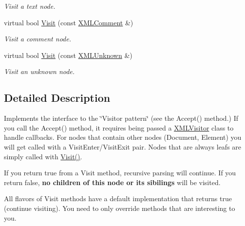 \begin{DoxyCompactItemize}
\begin{DoxyCompactList}\small\item\em Visit a text node. \end{DoxyCompactList}\item 
\mbox{\label{classtinyxml2_1_1XMLVisitor_acc8147fb5a85f6c65721654e427752d7}} 
virtual bool \hyperlink{classtinyxml2_1_1XMLVisitor_acc8147fb5a85f6c65721654e427752d7}{Visit} (const \hyperlink{classtinyxml2_1_1XMLComment}{X\+M\+L\+Comment} \&)
\begin{DoxyCompactList}\small\item\em Visit a comment node. \end{DoxyCompactList}\item 
\mbox{\label{classtinyxml2_1_1XMLVisitor_a14e4748387c34bf53d24e8119bb1f292}} 
virtual bool \hyperlink{classtinyxml2_1_1XMLVisitor_a14e4748387c34bf53d24e8119bb1f292}{Visit} (const \hyperlink{classtinyxml2_1_1XMLUnknown}{X\+M\+L\+Unknown} \&)
\begin{DoxyCompactList}\small\item\em Visit an unknown node. \end{DoxyCompactList}\end{DoxyCompactItemize}


\subsection{Detailed Description}
Implements the interface to the \char`\"{}\+Visitor pattern\char`\"{} (see the Accept() method.) If you call the Accept() method, it requires being passed a \hyperlink{classtinyxml2_1_1XMLVisitor}{X\+M\+L\+Visitor} class to handle callbacks. For nodes that contain other nodes (Document, Element) you will get called with a Visit\+Enter/\+Visit\+Exit pair. Nodes that are always leafs are simply called with \hyperlink{classtinyxml2_1_1XMLVisitor_adc75bd459fc7ba8223b50f0616767f9a}{Visit()}.

If you return \textquotesingle{}true\textquotesingle{} from a Visit method, recursive parsing will continue. If you return false, {\bfseries no children of this node or its sibilings} will be visited.

All flavors of Visit methods have a default implementation that returns \textquotesingle{}true\textquotesingle{} (continue visiting). You need to only override methods that are interesting to you.

